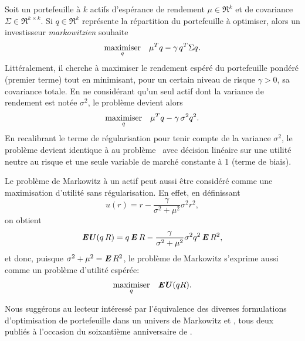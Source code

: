 Soit un portefeuille à $k$ actifs d'espérance de rendement $\mu\in\Re^k$ et de covariance
$\Sigma \in \Re^{k\times k}$. Si $q \in \Re^k$ représente la répartition du portefeuille à optimiser, alors
un investisseur \textit{markowitzien} souhaite
\begin{equation}
  \label{rev:marko}
  \maximizeEquation[q]{\mu^Tq - \gamma\,q^T\Sigma q.}
\end{equation}
Littéralement, il cherche à maximiser le rendement espéré du portefeuille pondéré (premier
terme) tout en minimisant, pour un certain niveau de risque $\gamma>0$, sa covariance
totale. En ne considérant qu'un seul actif dont la variance de rendement est notée $\sigma^2$,
le problème devient alors
\begin{equation}
  \maximizeEquation[q]{\mu^Tq - \gamma\,\sigma^2 q^2.}
\end{equation}
En recalibrant le terme de régularisation pour tenir compte de la variance $\sigma^2$, le
problème devient identique à au problème \cit\ avec décision linéaire sur une utilité
neutre au risque et une seule variable de marché constante à 1 (terme de biais).

Le problème de Markowitz à un actif peut aussi être considéré comme une maximisation
d'utilité sans régularisation. En effet, en définissant
\begin{equation}
  u(r) = r - \frac{\gamma}{\sigma^2+\mu^2}\sigma^2r^2,
\end{equation}
on obtient
\begin{equation}
  \EU(q\,R) = q \E R - \frac{\gamma}{\sigma^2+\mu^2}\sigma^2 q^2\E R^2,
\end{equation}
et donc, puisque $\sigma^2 + \mu^2 = \E R^2$, le problème de Markowitz s'exprime aussi comme un
problème d'utilité espérée:
\begin{equation}
  \maximizeEquation[q]{\EU(qR).}
\end{equation}

Nous suggérons au lecteur intéressé par l'équivalence des diverses formulations
d'optimisation de portefeuille dans un univers de Markowitz \cite{bodnar2013equivalence}
et \cite{markowitz2014mean}, tous deux publiés à l'occasion du soixantième anniversaire de
\cite{markowitz1952portfolio}.


